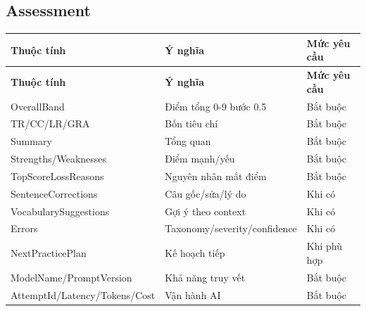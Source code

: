 \documentclass[11pt,a4paper]{article}
\begin{document}
\subsection{Assessment}
\small
\setlength{\tabcolsep}{4pt}
\renewcommand{\arraystretch}{1.18}
\begin{longtable}{|P{0.28\textwidth}|P{0.45\textwidth}|P{0.19\textwidth}|}
\hline
\textbf{Thuộc tính} & \textbf{Ý nghĩa} & \textbf{Mức yêu cầu} \\ \hline
\endfirsthead
\hline
\textbf{Thuộc tính} & \textbf{Ý nghĩa} & \textbf{Mức yêu cầu} \\ \hline
\endhead
OverallBand & Điểm tổng 0-9 bước 0.5 & Bắt buộc \\ \hline
TR/\allowbreak{}CC/\allowbreak{}LR/\allowbreak{}GRA & Bốn tiêu chí & Bắt buộc \\ \hline
Summary & Tổng quan & Bắt buộc \\ \hline
Strengths/\allowbreak{}Weaknesses & Điểm mạnh/\allowbreak{}yếu & Bắt buộc \\ \hline
TopScoreLossReasons & Nguyên nhân mất điểm & Bắt buộc \\ \hline
SentenceCorrections & Câu gốc/\allowbreak{}sửa/\allowbreak{}lý do & Khi có \\ \hline
VocabularySuggestions & Gợi ý theo context & Khi có \\ \hline
Errors & Taxonomy/\allowbreak{}severity/\allowbreak{}confidence & Khi có \\ \hline
NextPracticePlan & Kế hoạch tiếp & Khi phù hợp \\ \hline
ModelName/\allowbreak{}PromptVersion & Khả năng truy vết & Bắt buộc \\ \hline
AttemptId/\allowbreak{}Latency/\allowbreak{}Tokens/\allowbreak{}Cost & Vận hành AI & Bắt buộc \\ \hline
\end{longtable}
\normalsize
\end{document}
